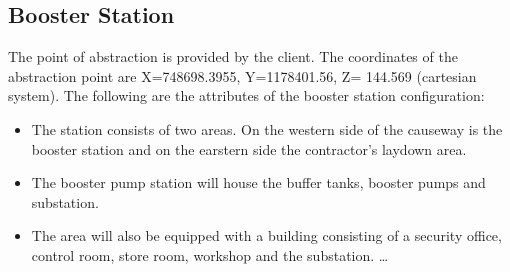 \documentclass{article}%
\begin{document}
\subsection{Booster Station}%
\label{subsec:BoosterStation}%
The point of abstraction is provided by the client. The coordinates of the abstraction point are X=748698.3955, Y=1178401.56, Z= 144.569 (cartesian system).%
\newline%
%
\newline%
%
The following are the attributes of the booster station configuration:%
\begin{itemize}%
\item%
The station consists of two areas. On the western side of the causeway is the booster station and on the earstern side the contractor's laydown area.%
\item%
The booster pump station will house the buffer tanks, booster pumps and substation.%
\item%
The area will also be equipped with a building consisting of a security office, control room, store room, workshop and the substation.%
\ldots%
\end{itemize}

%
\newpage%
\end{document}
